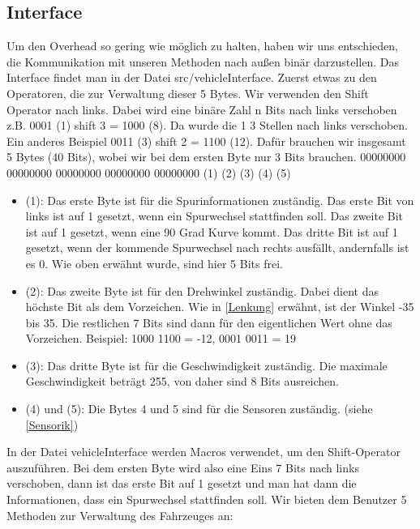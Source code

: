 	\subsection{Interface}
	
        Um den Overhead so gering wie möglich zu halten, haben wir uns entschieden, die Kommunikation mit unseren Methoden nach außen binär darzustellen. Das Interface findet man in der Datei src/vehicleInterface.
        Zuerst etwas zu den Operatoren, die zur Verwaltung dieser 5 Bytes. Wir verwenden den Shift Operator nach links. 
        Dabei wird eine binäre Zahl n Bits nach links verschoben z.B. 0001 (1) shift 3 = 1000 (8). Da wurde die 1 3 Stellen nach links verschoben. Ein anderes Beispiel 0011 (3) shift 2 = 1100 (12).
        Dafür brauchen wir insgesamt 5 Bytes (40 Bits), wobei wir bei dem ersten Byte nur 3 Bits brauchen. 
        00000000 00000000 00000000 00000000 00000000 
        (1)	     (2)      (3)      (4)      (5)
        
        \begin{itemize}
            \item (1): Das erste Byte ist für die Spurinformationen zuständig. Das erste Bit von links ist auf 1 gesetzt, wenn ein Spurwechsel stattfinden soll. Das zweite Bit ist auf 1 gesetzt, wenn eine 90 Grad Kurve kommt. Das dritte Bit ist auf 1 gesetzt, wenn der kommende Spurwechsel nach rechts ausfällt, andernfalls ist es 0. Wie oben erwähnt wurde, sind hier 5 Bits frei.
            \item (2): Das zweite Byte ist für den Drehwinkel zuständig. Dabei dient das höchste Bit als dem Vorzeichen. Wie in \autoref{Lenkung} erwähnt, ist der Winkel -35 bis 35.
            Die restlichen 7 Bits sind dann für den eigentlichen Wert ohne das Vorzeichen. 
            Beispiel: 1000 1100 = -12, 0001 0011 = 19
            \item (3): Das dritte Byte ist für die Geschwindigkeit zuständig. Die maximale Geschwindigkeit beträgt 255, von daher sind 8 Bits ausreichen.
            \item (4) und (5): Die Bytes 4 und 5 sind für die Sensoren zuständig. (siehe \autoref{Sensorik})
        \end{itemize}
        
        In der Datei vehicleInterface werden Macros verwendet, um den Shift-Operator auszuführen.
        Bei dem ersten Byte wird also eine Eins 7 Bits nach links verschoben, dann ist das erste Bit auf 1 gesetzt und man hat dann die Informationen, dass ein Spurwechsel stattfinden soll.
        Wir bieten dem Benutzer 5 Methoden zur Verwaltung des Fahrzeuges an:
        
